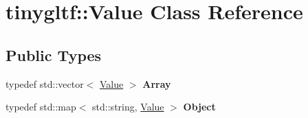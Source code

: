 \hypertarget{classtinygltf_1_1Value}{}\section{tinygltf\+:\+:Value Class Reference}
\label{classtinygltf_1_1Value}
\subsection*{Public Types}
\begin{DoxyCompactItemize}
\item 
\mbox{\label{classtinygltf_1_1Value_ad09a2238eb07711579ce6dfd88e7c4e0}} 
typedef std\+::vector$<$ \hyperlink{classtinygltf_1_1Value}{Value} $>$ {\bfseries Array}
\item 
\mbox{\label{classtinygltf_1_1Value_a1af8390d517aa6110eec792fbbea93f1}} 
typedef std\+::map$<$ std\+::string, \hyperlink{classtinygltf_1_1Value}{Value} $>$ {\bfseries Object}
\end{DoxyCompactItemize}
